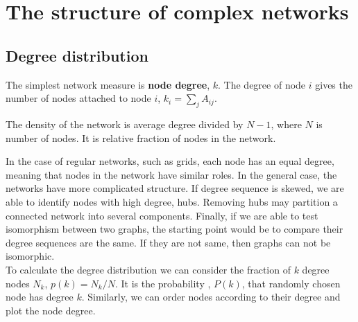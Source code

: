 \section{The structure of complex networks}


\subsection{Degree distribution}

The simplest network measure is \textbf{node degree}, $k$. The degree of node $i$ gives the number of nodes attached to node $i$, $k_i = \sum_j A_{ij}$. 

The density of the network is average degree divided by $N-1$, where $N$ is number of nodes. It is relative fraction of nodes in the network. 

In the case of regular networks, such as grids, each node has an equal degree, meaning that nodes in the network have similar roles. In the general case, the networks have more complicated structure. If degree sequence is skewed, we are able to identify nodes with high degree, hubs. Removing hubs may partition a connected network into several components. Finally, if we are able to test isomorphism between two graphs, the starting point would be to compare their degree sequences are the same. If they are not same, then graphs can not be isomorphic. \\

To calculate the degree distribution we can consider the fraction of $k$ degree nodes $N_k$, $p(k) = N_k/N$. It is the probability , $P(k)$, that randomly chosen node has degree $k$. Similarly, we can order nodes according to their degree and plot the node degree.



